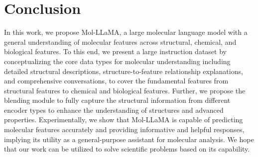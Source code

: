 \section{Conclusion}
\vspace{-0.0391in}
In this work, we propose Mol-LLaMA, a large molecular language model with a general understanding of molecular features across structural, chemical, and biological features. To this end, we present a large instruction dataset by conceptualizing the core data types for molecular understanding including detailed structural descriptions, structure-to-feature relationship explanations, and comprehensive conversations, to cover the fundamental features from structural features to chemical and biological features. Further, we propose the blending module to fully capture the structural information from different encoder types to enhance the understanding of structures and advanced properties. Experimentally, we show that Mol-LLaMA is capable of predicting molecular features accurately and providing informative and helpful responses, implying its utility as a general-purpose assistant for molecular analysis. We hope that our work can be utilized to solve scientific problems based on its capability.
